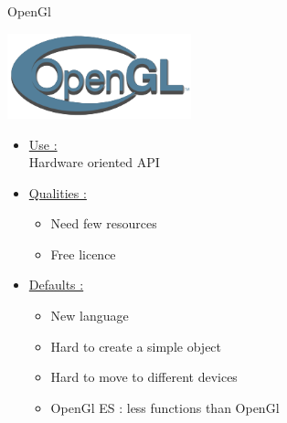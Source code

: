 \documentclass[a4paper,10pt]{beamer}
\begin{document}
			\begin{frame}{OpenGl}
				\begin{multicols}{2}
					\includegraphics[height=70pt]{images/logos/OpenGL_logo.png}\\
					
					\columnbreak 
					
					\begin{itemize}
						\item \underline{Use :}\\		
						Hardware oriented API			
						\item \underline{Qualities :}\\
						\begin{itemize}
							\item Need few resources
							\item Free licence
						\end{itemize}
					\end{itemize}		 
				\end{multicols}
				\begin{itemize}
					\item \underline{Defaults :}\\
					\begin{itemize}
						\item New language
						\item Hard to create a simple object
						\item Hard to move to different devices
						\item OpenGl ES : less functions than OpenGl
					\end{itemize}
				\end{itemize}
			\end{frame}
			
\end{document}
